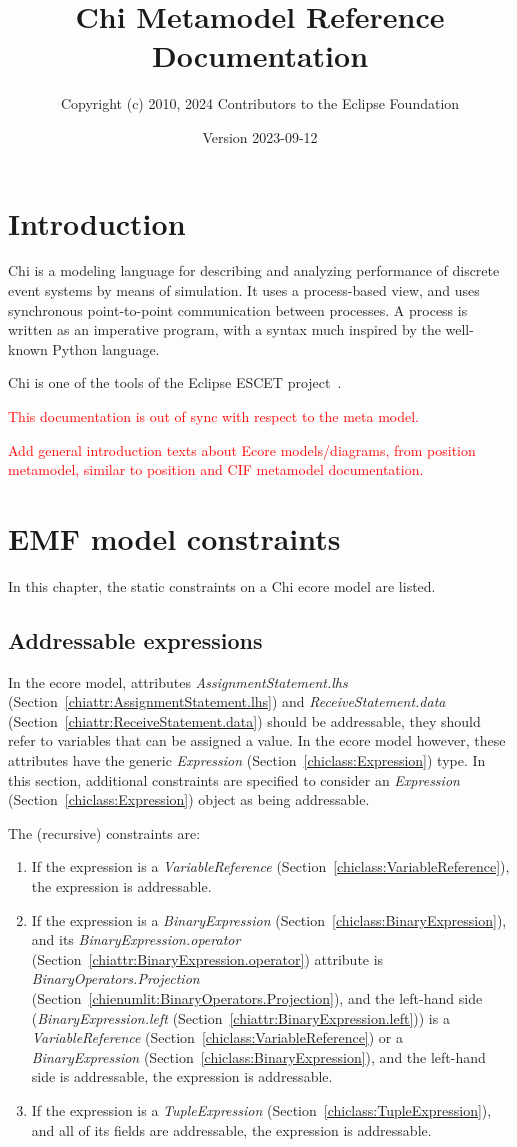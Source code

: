 \documentclass{report}
\title{Chi Metamodel Reference Documentation}
\author{Copyright (c) 2010, 2024 Contributors to the Eclipse Foundation}
\date{Version 2023-09-12}
\newcommand{\chiclass}[1]{\textit{#1} (Section~\ref{chiclass:#1})}
\newcommand{\chiattr}[1]{\textit{#1} (Section~\ref{chiattr:#1})}
\newcommand{\chienumlit}[1]{\textit{#1} (Section~\ref{chienumlit:#1})}
\newcommand{\todo}[1]{\textcolor{red}{#1}}
\begin{document}
\maketitle
\tableofcontents

\chapter{Introduction}

Chi is a modeling language for describing and analyzing performance of
discrete event systems by means of simulation.
It uses a process-based view, and uses synchronous point-to-point
communication between processes. A process is written as an imperative
program, with a syntax much inspired by the well-known Python language.

Chi is one of the tools of the Eclipse ESCET\textsuperscript{\texttrademark{}}
project~\cite{Eclipse:ESCET}.

\todo{This documentation is out of sync with respect to the meta model.}

\todo{Add general introduction texts about Ecore models/diagrams, from
position metamodel, similar to position and CIF metamodel documentation.}


\chapter{EMF model constraints}
In this chapter, the static constraints on a Chi ecore model are listed.

\section{Addressable expressions}\label{sect:addressable-expressions}
In the ecore model, attributes \chiattr{AssignmentStatement.lhs} and
\chiattr{ReceiveStatement.data} should be addressable, they should refer to
variables that can be assigned a value.
In the ecore model however, these attributes have the generic
\chiclass{Expression} type. In this section, additional constraints are
specified to consider an \chiclass{Expression} object as being addressable.

The (recursive) constraints are:
\begin{enumerate}
\item If the expression is a \chiclass{VariableReference}, the expression is
    addressable.
\item If the expression is a \chiclass{BinaryExpression}, and its
    \chiattr{BinaryExpression.operator} attribute is
    \chienumlit{BinaryOperators.Projection}, and the left-hand side
    (\chiattr{BinaryExpression.left}) is a \chiclass{VariableReference} or a
    \chiclass{BinaryExpression}, and the left-hand side is addressable,
    the expression is addressable.
\item If the expression is a \chiclass{TupleExpression}, and all of its
    fields are addressable, the expression is addressable.
\end{enumerate}
\end{document}
